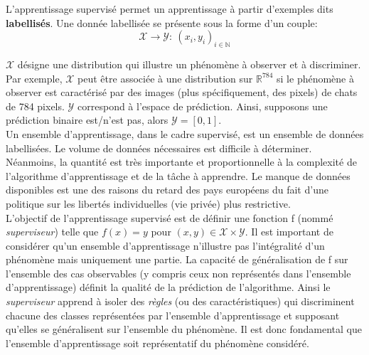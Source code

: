 \noindent L'apprentissage supervisé permet un apprentissage à partir d'exemples dits \textbf{labellisés}. Une donnée labellisée se présente sous la forme d'un couple:
$$\mathcal{X} \rightarrow \mathcal{Y}: \ (x_i,y_i)_{i \in \mathbb{N}}$$

\noindent $\mathcal{X}$ désigne une distribution qui illustre un phénomène à observer et à discriminer. Par exemple, $\mathcal{X}$ peut être associée à une distribution sur $\mathbb{R}^{784}$  si le phénomène à observer est caractérisé par des images (plus spécifiquement, des pixels) de chats de 784 pixels. $\mathcal{Y}$ correspond à l'espace de prédiction. Ainsi, supposons une prédiction binaire est/n'est pas, alors $\mathcal{Y}=[0,1]$.\\

\noindent Un ensemble d'apprentissage, dans le cadre supervisé, est un ensemble de données labellisées. Le volume de données nécessaires est difficile à déterminer. Néanmoins, la quantité est très importante et proportionnelle à la complexité de l'algorithme d'apprentissage et de la tâche à apprendre. Le manque de données disponibles est une des raisons du retard des pays européens du fait d'une politique sur les libertés individuelles (vie privée) plus restrictive.\\

\noindent L'objectif de l'apprentissage supervisé est de définir une fonction f (nommé \textit{superviseur}) telle que $f(x)=y$ pour $(x,y) \in \mathcal{X} \times \mathcal{Y}$. Il est important de considérer qu'un ensemble d'apprentissage n'illustre pas l'intégralité d'un phénomène mais uniquement une partie. La capacité de généralisation de f sur l'ensemble des cas observables (y compris ceux non représentés dans l'ensemble d'apprentissage) définit la qualité de la prédiction de l'algorithme. Ainsi le \textit{superviseur} apprend à isoler des \textit{règles} (ou des caractéristiques) qui discriminent chacune des classes représentées par l'ensemble d'apprentissage et supposant qu'elles se généralisent sur l'ensemble du phénomène. Il est donc fondamental que l'ensemble d'apprentissage soit représentatif du phénomène considéré. \\

